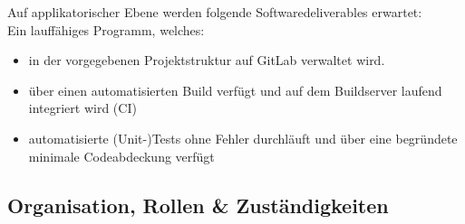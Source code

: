 Auf applikatorischer Ebene werden folgende Softwaredeliverables erwartet:\\
Ein lauffähiges Programm, welches:
\begin{itemize}
\item in der vorgegebenen Projektstruktur auf GitLab verwaltet wird.
\item über einen automatisierten Build verfügt und auf dem Buildserver laufend integriert wird (CI)
\item automatisierte (Unit-)Tests ohne Fehler durchläuft und über eine begründete minimale Codeabdeckung verfügt
\end{itemize}

\subsection{Organisation, Rollen \& Zuständigkeiten}
